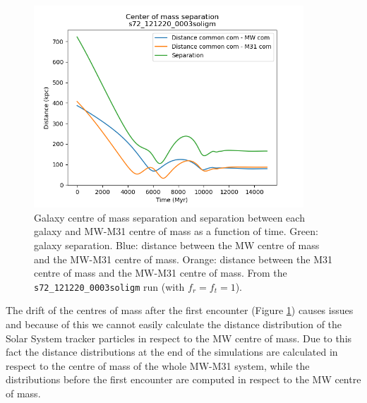 \documentclass[a4paper,12pt, english]{article}
\begin{document}
\begin{figure}[!h]
    \centering
    \includegraphics[width=0.9\textwidth]{separation/s72_121220_0003soligm_separation.png}
    \caption{Galaxy centre of mass separation and separation between each galaxy and MW-M31 centre of mass as a function of time. Green: galaxy separation. Blue: distance between the MW centre of mass and the MW-M31 centre of mass. Orange: distance between the M31 centre of mass and the MW-M31 centre of mass. From the \texttt{s72\_121220\_0003soligm} run (with \(f_r = f_t = 1\)).}
    \label{fig:com-separation}
\end{figure}
\smallskip
The drift of the centres of mass after the first encounter (Figure \ref{fig:com-separation}) causes issues and because of this we cannot easily calculate the distance distribution of the Solar System tracker particles in respect to the MW centre of mass. Due to this fact the distance distributions at the end of the simulations are calculated in respect to the centre of mass of the whole MW-M31 system, while the distributions before the first encounter are computed in respect to the MW centre of mass.\par
\newpage
\end{document}
